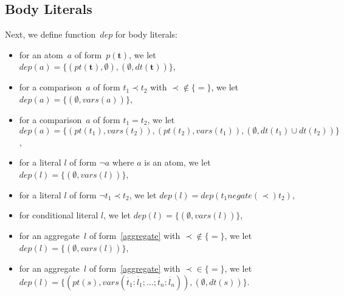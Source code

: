 \documentclass{article}
\newcommand{\pool}[1]{\boldsymbol{#1}}
\newcommand{\tuple}[1]{\dot{#1}}
\newcommand{\set}[1]{\{#1\}}
\newcommand\Vars{\mathit{vars}}
\newcommand\Negate{\mathit{negate}}
\newcommand\Provide{\mathit{pt}}
\newcommand\Depend{\mathit{dt}}
\newcommand\ProDep{\mathit{dep}}
\begin{document}
	\subsection{Body Literals}
	Next, we define function~$\ProDep$ for body literals:
	\begin{itemize}
		\item 
			for an atom~$a$ of form~$p(\pool{t})$, we let
			$\ProDep(a) = \set{(\Provide(\pool{t}), \emptyset), (\emptyset, \Depend(\pool{t}))}$,
		\item
			for a comparison~$a$ of form $t_1 \prec t_2$ with ${\prec} \notin \set{{=}}$, we let
			$\ProDep(a) = \set{(\emptyset, \Vars(a))}$,
		\item
			for a comparison~$a$ of form $t_1 = t_2$, we let
			$\ProDep(a) = \set{(\Provide(t_1), \Vars(t_2)), (\Provide(t_2), \Vars(t_1)), (\emptyset, \Depend(t_1) \cup \Depend(t_2))}$,
		\item 
			for a literal $l$ of form $\neg a$ where $a$ is an atom, we let
			$\ProDep(l) = \set{(\emptyset, \Vars(l))}$,
		\item 
			for a literal $l$ of form $\neg t_1 \prec t_2$, we let
			$\ProDep(l) = \ProDep(t_1 \mathrel{\Negate({\prec})} t_2)$,
		\item
			for conditional literal $l$, we let
			$\ProDep(l) = \set{(\emptyset, \Vars(l))}$,
		\item
			for an aggregate~$l$ of form~\eqref{aggregate} with ${\prec} \notin \set{{=}}$, we let
			$\ProDep(l) = \set{(\emptyset, \Vars(l))}$,
		\item
			for an aggregate~$l$ of form~\eqref{aggregate} with ${\prec} \in \set{{=}}$, we let
			$\ProDep(l) = \set{(\Provide(s), \Vars(\tuple{t_1} : \tuple{l_1}; \dots; \tuple{t_n} : \tuple{l_n})), (\emptyset,\Depend(s))}$.
	\end{itemize}
\end{document}
